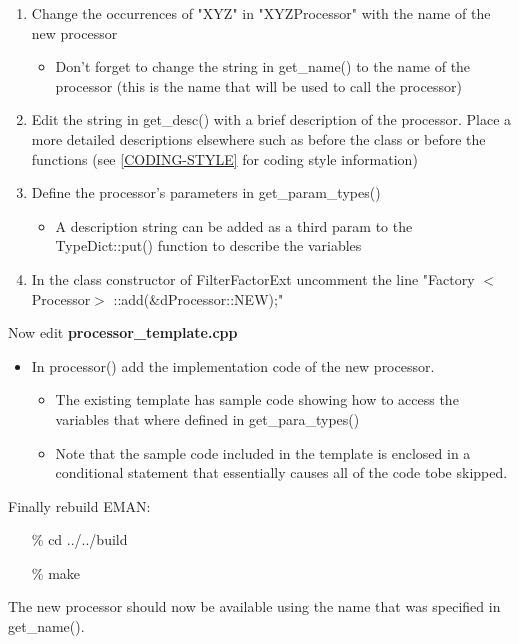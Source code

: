       \begin{enumerate}
	\item
	  Change the occurrences of "XYZ" in "XYZProcessor" with the name of
	  the new processor
	  \begin{itemize}
	    \item
	      Don't forget to change the string in get\_name() to the name of
	      the processor (this is the name that will be used to
	      call the processor)
	  \end{itemize}
	\item
	  Edit the string in get\_desc() with a brief description of the
	  processor.  Place a more detailed descriptions elsewhere such as
          before the class or before the functions (see
	  \ref{CODING-STYLE} for coding style information)
	\item
	  Define the processor's parameters in get\_param\_types()
	  \begin{itemize}
	    \item
	      A description string can be added as a third param to the
	      TypeDict::put() function to describe the variables 
	  \end{itemize}
	\item
	  In the class constructor of FilterFactorExt uncomment the line
	  "Factory $<$Processor$>$ ::add(\&dProcessor::NEW);"
      \end{enumerate}

      Now edit \textbf{\color[named]{Brown}processor\_template.cpp}
      
      \begin{itemize}
	\item
	  In processor() add the implementation code of the new
	  processor.
	  \begin{itemize}
	    \item
	      The existing template has sample code showing how to access the
	      variables that where defined in get\_para\_types()
	    \item
	      Note that the sample code included in the template is enclosed in
	      a conditional statement that essentially causes all of
	      the code tobe skipped.
	  \end{itemize}
      \end{itemize}

      Finally rebuild EMAN:
      \color[named]{Blue}
      \begin{itemize}
	\item[\%] cd ../../build
	\item[\%] make
      \end{itemize}
      \normalcolor
      The new processor should now be available using the name that was
      specified in get\_name().



